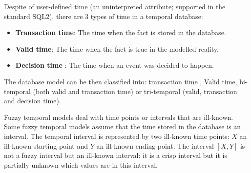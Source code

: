 Despite of user-defined time (an uninterpreted attribute; supported in the standard SQL2), there are 3 types of time in a temporal database:

\begin{itemize}
	\item
	\textbf{Transaction time}: The time when the fact is stored in the database.
	\item
	\textbf{Valid time}: The time when the fact is true in the modelled reality.
	\item
	\textbf{Decision time} \cite{Nascimento95}: The time when an event was decided to happen. 
	\end{itemize}
	
	 The  database model can be then classified into: transaction time \cite{Jensen91}, Valid time, bi-temporal \cite{Snodgrass84}(both valid and transaction time) or tri-temporal \cite{Nascimento95} (valid, transaction and decision time).

Fuzzy temporal models \cite{schockaert08} deal with time points \cite{Dubois89} or intervals \cite{Garrido2009} that are ill-known. Some fuzzy temporal models assume that the time stored in the database is an interval. The temporal interval is represented by two ill-known time points: $X$  an ill-known starting point and $Y$ an ill-known ending point. The interval $\left[X,Y\right]$ is not a fuzzy interval but an ill-known interval: it is a crisp interval but it is partially unknown which values are in this interval.
